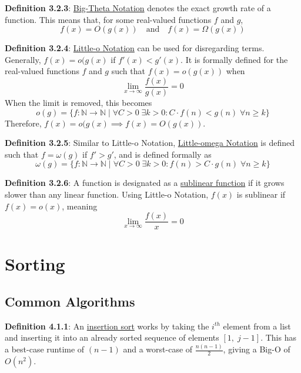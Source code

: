 \documentclass{article}
\newcommand{\separate}[1] {\vspace{#1 pt}\noindent}
\newcommand{\N}{\mathbb{N}}
\newcommand{\definition}[2]{\textbf{Definition #1}: #2\label{def:#1}}
\begin{document}
\separate{5}\definition{3.2.3}{\underline{Big-Theta Notation} denotes the exact growth rate of a function. This means that, for some real-valued functions \(f\) and \(g\),}
\begin{equation}
    f(x) = O(g(x)) \quad\text{and}\quad f(x)=\Omega(g(x))
\end{equation}

\separate{5}\definition{3.2.4}{\underline{Little-o Notation} can be used for disregarding \say{small-order} terms. Generally, \(f(x) = o(g(x)\) if \(f'(x) < g'(x)\). It is formally defined for the real-valued functions \(f\) and \(g\) such that \(f(x) = o(g(x))\) when}
\begin{equation}
    \lim_{x\rightarrow\infty} \frac{f(x)}{g(x)} = 0
\end{equation}
When the limit is removed, this becomes
\begin{equation}
    o(g) = \{f: \N \rightarrow \N \;|\; \forall C > 0 \;\exists k > 0 : C \cdot f(n) < g(n) \;\forall n \geq k \} 
\end{equation}
Therefore, \(f(x) = o(g(x) \implies f(x) = O(g(x))\).

\newpage\noindent\definition{3.2.5}{Similar to Little-o Notation, \underline{Little-omega Notation} is defined such that \(f=\omega(g)\) if \(f' > g'\),}
and is defined formally as
\begin{equation}
    \omega(g) = \{f: \N \rightarrow \N \;|\; \forall C > 0 \;\exists k > 0 : f(n) > C \cdot g(n) \;\forall n \geq k \} 
\end{equation}

\separate{5}\definition{3.2.6}{A function is designated as a \underline{sublinear function} if it grows slower than any linear function. Using Little-o Notation, \(f(x)\) is sublinear if \(f(x) = o(x)\), meaning}
\begin{equation}
    \lim_{x \rightarrow \infty} \frac{f(x)}{x} = 0
\end{equation}

\section{Sorting}

\subsection{Common Algorithms}

\definition{4.1.1}{An \underline{insertion sort} works by taking the \(i^{th}\) element from a list and inserting it into an already sorted sequence of elements \([1,\;j-1]\).}
This has a best-case runtime of \((n-1)\) and a worst-case of \(\frac{n(n-1)}{2}\), giving a Big-O of \(O(n^2)\).
\end{document}
